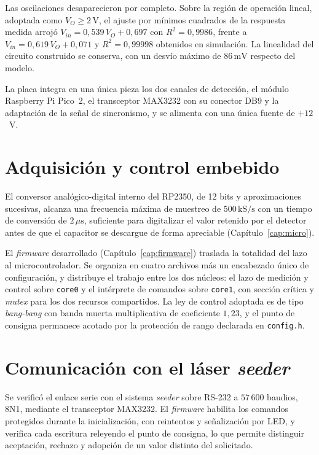 Las oscilaciones desaparecieron por completo. Sobre la región de operación lineal,
adoptada como $V_O \ge 2\,\text{V}$, el ajuste por mínimos cuadrados de la respuesta
medida arrojó $V_{in} = 0{,}539\,V_O + 0{,}697$ con $R^2 = 0{,}9986$, frente a
$V_{in} = 0{,}619\,V_O + 0{,}071$ y $R^2 = 0{,}99998$ obtenidos en simulación. La
linealidad del circuito construido se conserva, con un desvío máximo de
$86\,\text{mV}$ respecto del modelo.

La placa integra en una única pieza los dos canales de detección, el módulo Raspberry
Pi Pico~2, el transceptor MAX3232 con su conector DB9 y la adaptación de la señal de
sincronismo, y se alimenta con una única fuente de $+12$~V.

\section*{Adquisición y control embebido}

El conversor analógico-digital interno del RP2350, de 12 bits y aproximaciones
sucesivas, alcanza una frecuencia máxima de muestreo de $500\,\mathrm{kS/s}$ con un
tiempo de conversión de $2\,\mu\mathrm{s}$, suficiente para digitalizar el valor
retenido por el detector antes de que el capacitor se descargue de forma apreciable
(Capítulo~\ref{cap:micro}).

El \emph{firmware} desarrollado (Capítulo~\ref{cap:firmware}) traslada la totalidad
del lazo al microcontrolador. Se organiza en cuatro archivos más un
encabezado único de configuración, y distribuye el trabajo entre los dos núcleos: el
lazo de medición y control sobre \texttt{core0} y el intérprete de comandos sobre
\texttt{core1}, con sección crítica y \emph{mutex} para los dos recursos compartidos.
La ley de control adoptada es de tipo \emph{bang-bang} con banda muerta
multiplicativa de coeficiente $1{,}23$, y el punto de consigna permanece acotado por
la protección de rango declarada en \texttt{config.h}.

\section*{Comunicación con el láser \emph{seeder}}

Se verificó el enlace serie con el sistema \emph{seeder} sobre RS-232 a $57\,600$
baudios, 8N1, mediante el transceptor MAX3232. El \emph{firmware} habilita los
comandos protegidos durante la inicialización, con reintentos y señalización por LED,
y verifica cada escritura releyendo el punto de consigna, lo que permite distinguir
aceptación, rechazo y adopción de un valor distinto del solicitado.


